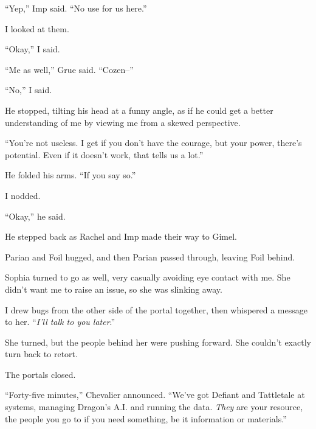 ``Yep,'' Imp said.  ``No use for us here.''



I looked at them.



``Okay,'' I said.



``Me as well,'' Grue said.  ``Cozen--''



``No,'' I said.



He stopped, tilting his head at a funny angle, as if he could get a better understanding of me by viewing me from a skewed perspective.



``You're not useless.  I get if you don't have the courage, but your power, there's potential.  Even if it doesn't work, that tells us a lot.''



He folded his arms.  ``If you say so.''



I nodded.



``Okay,'' he said.



He stepped back as Rachel and Imp made their way to Gimel.



Parian and Foil hugged, and then Parian passed through, leaving Foil behind.



Sophia turned to go as well, very casually avoiding eye contact with me.  She didn't want me to raise an issue, so she was slinking away.



I drew bugs from the other side of the portal together, then whispered a message to her.  ``\emph{I'll talk to you later}.''



She turned, but the people behind her were pushing forward.  She couldn't exactly turn back to retort.



The portals closed.



``Forty-five minutes,'' Chevalier announced.  ``We've got Defiant and Tattletale at systems, managing Dragon's A.I. and running the data.  \emph{They} are your resource, the people you go to if you need something, be it information or materials.''



